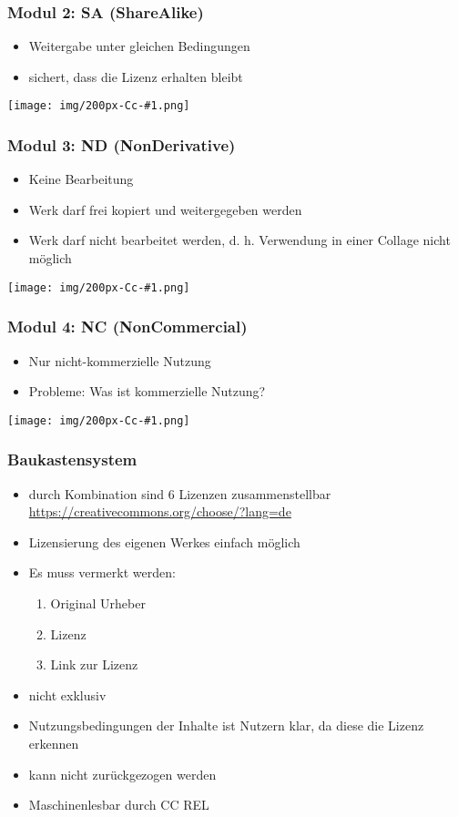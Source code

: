 \documentclass[table]{beamer}
\newcommand{\Cc}[1]{\begin{center}
    \texttt{[image: img/200px-Cc-\#1.png]}
\end{center}}
\begin{document}
\begin{frame}
    \frametitle{Modul 2: SA (ShareAlike)}
    \begin{itemize}
        \item Weitergabe unter gleichen Bedingungen
        \item sichert, dass die Lizenz erhalten bleibt
    \end{itemize}
    \Cc{sa}
\end{frame}

\begin{frame}
    \frametitle{Modul 3: ND (NonDerivative)}
    \begin{itemize}
        \item Keine Bearbeitung
        \item Werk darf frei kopiert und weitergegeben werden
        \item Werk darf nicht bearbeitet werden, d. h. Verwendung in einer Collage nicht möglich
    \end{itemize}
    \Cc{nd}
\end{frame}

\begin{frame}
    \frametitle{Modul 4: NC (NonCommercial)}
    \begin{itemize}
        \item Nur nicht-kommerzielle Nutzung
        \item Probleme: Was ist kommerzielle Nutzung?
    \end{itemize}
    \Cc{nc}
\end{frame}


\begin{frame}
    \frametitle{Baukastensystem}
    \begin{itemize}
        \item<2-> durch Kombination sind 6 Lizenzen zusammenstellbar
            \url{https://creativecommons.org/choose/?lang=de}
        \item<3-> Lizensierung des eigenen Werkes einfach möglich
        \item<4-> Es muss vermerkt werden:
            \begin{enumerate}
                \item<5-> Original Urheber
                \item<6-> Lizenz
                \item<7-> Link zur Lizenz
            \end{enumerate}
        \item<8-> nicht exklusiv
        \item<9-> Nutzungsbedingungen der Inhalte ist Nutzern klar, da diese die Lizenz erkennen
        \item<10-> kann nicht zurückgezogen werden
        \item<11-> Maschinenlesbar durch CC REL
    \end{itemize}
\end{frame}
\end{document}
